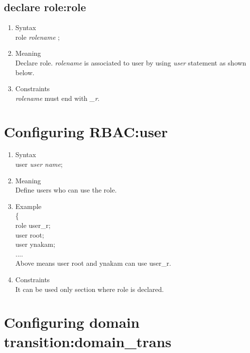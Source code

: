 \documentclass{article}
\begin{document}
\subsection{declare role:role}
\begin{enumerate}
 \item Syntax\\
    role {\it  rolename } ;
 \item Meaning\\
     Declare role.  {\it  rolename } is associated to user by using
       {\it user} statement as shown below.
 \item Constraints\\
       {\it rolename} must end with {\it \_r}.
\end{enumerate}

\section{Configuring RBAC:user}
\begin{enumerate}
 \item Syntax\\
       user {\it user name};
 \item Meaning\\
       Define users who can use the role. 
 \item Example\\
       \{\\
       role user\_r;\\
       user root;\\
       user ynakam;\\
       ....\\
Above means user root and ynakam can use user\_r.
\item Constraints\\
       It can be used only section where role is declared. 

\end{enumerate}

\section{Configuring domain transition:domain\_trans}
\end{document}

